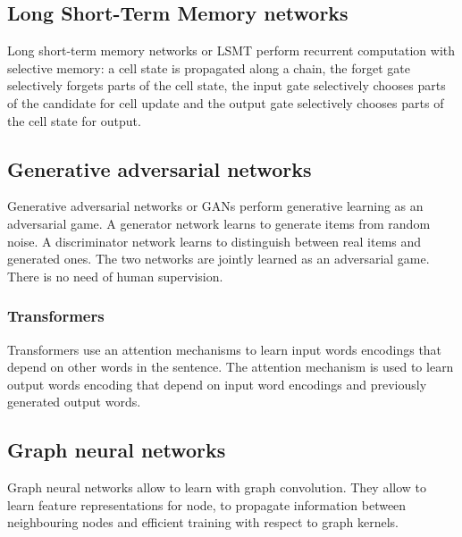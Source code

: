 	\subsection{Long Short-Term Memory networks}
	Long short-term memory networks or LSMT perform recurrent computation with selective memory: a cell state is propagated along a chain, the forget gate selectively forgets parts of the cell state, the input gate selectively chooses parts of the candidate for cell update and the output gate selectively chooses parts of the cell state for output.

	\subsection{Generative adversarial networks}
	Generative adversarial networks or GANs perform generative learning as an adversarial game.
	A generator network learns to generate items from random noise.
	A discriminator network learns to distinguish between real items and generated ones.
	The two networks are jointly learned as an adversarial game.
	There is no need of human supervision.

		\subsubsection{Transformers}
		Transformers use an attention mechanisms to learn input words encodings that depend on other words in the sentence.
		The attention mechanism is used to learn output words encoding that depend on input word encodings and previously generated output words.

	\subsection{Graph neural networks}
	Graph neural networks allow to learn with graph convolution.
	They allow to learn feature representations for node, to propagate information between neighbouring nodes and efficient training with respect to graph kernels.
